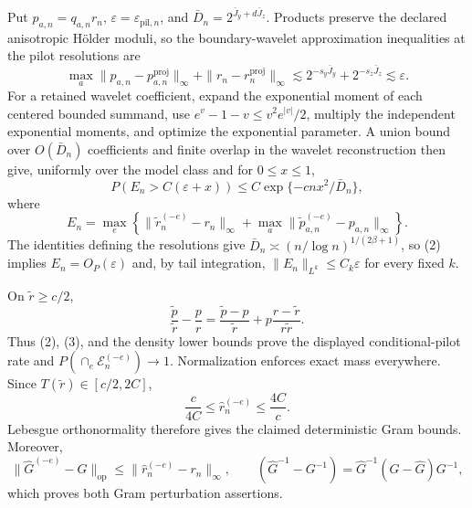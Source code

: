 Put \(p_{a,n}=q_{a,n}r_n\), \(\varepsilon=\varepsilon_{\mathrm{pil},n}\), and \(\bar D_n=2^{\bar J_y+d\bar J_z}\). Products preserve the declared anisotropic H\"older moduli, so the boundary-wavelet approximation inequalities at the pilot resolutions are
\[
\max_a\|p_{a,n}-p_{a,n}^{\mathrm{proj}}\|_\infty
+\|r_n-r_n^{\mathrm{proj}}\|_\infty
\lesssim2^{-s_y\bar J_y}+2^{-s_z\bar J_z}\lesssim\varepsilon.       \tag{1}
\]
For a retained wavelet coefficient, expand the exponential moment of each centered bounded summand, use \(e^v-1-v\le v^2e^{|v|}/2\), multiply the independent exponential moments, and optimize the exponential parameter. A union bound over \(O(\bar D_n)\) coefficients and finite overlap in the wavelet reconstruction then give, uniformly over the model class and for \(0\le x\le1\),
\[
P\!\left(E_n>C(\varepsilon+x)\right)
\le C\exp\{-cnx^2/\bar D_n\},                                      \tag{2}
\]
where
\[
E_n=\max_e\left\{\|\widetilde r_n^{(-e)}-r_n\|_\infty
+\max_a\|\widetilde p_{a,n}^{(-e)}-p_{a,n}\|_\infty\right\}.
\]
The identities defining the resolutions give \(\bar D_n\asymp(n/\log n)^{1/(2\beta+1)}\), so (2) implies \(E_n=O_P(\varepsilon)\) and, by tail integration, \(\|E_n\|_{L^k}\le C_k\varepsilon\) for every fixed \(k\).

On \(\widetilde r\ge c/2\),
\[
\frac{\widetilde p}{\widetilde r}-\frac pr
=\frac{\widetilde p-p}{\widetilde r}+p\frac{r-\widetilde r}{r\widetilde r}. \tag{3}
\]
Thus (2), (3), and the density lower bounds prove the displayed conditional-pilot rate and \(P(\cap_e\mathcal E_n^{(-e)})\to1\). Normalization enforces exact mass everywhere. Since \(T(\widetilde r)\in[c/2,2C]\),
\[
\frac c{4C}\le\widehat r_n^{(-e)}\le\frac{4C}{c}.                  \tag{4}
\]
Lebesgue orthonormality therefore gives the claimed deterministic Gram bounds. Moreover,
\[
\|\widehat G^{(-e)}-G\|_{\mathrm{op}}
\le\|\widehat r_n^{(-e)}-r_n\|_\infty,
\qquad
(\widehat G^{-1}-G^{-1})=\widehat G^{-1}(G-\widehat G)G^{-1},       \tag{5}
\]
which proves both Gram perturbation assertions.


